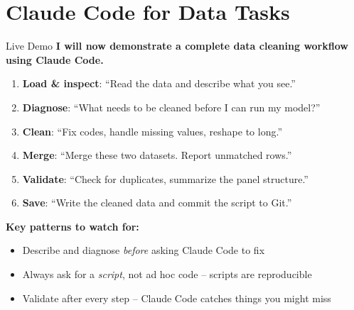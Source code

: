 \section{Claude Code for Data Tasks}

\begin{frame}{Live Demo}
  \textbf{I will now demonstrate a complete data cleaning workflow using Claude Code.}

  \vspace{10pt}

  \begin{enumerate}
    \item \textbf{Load \& inspect}: ``Read the data and describe what you see.''
    \item \textbf{Diagnose}: ``What needs to be cleaned before I can run my model?''
    \item \textbf{Clean}: ``Fix codes, handle missing values, reshape to long.''
    \item \textbf{Merge}: ``Merge these two datasets. Report unmatched rows.''
    \item \textbf{Validate}: ``Check for duplicates, summarize the panel structure.''
    \item \textbf{Save}: ``Write the cleaned data and commit the script to Git.''
  \end{enumerate}

  \vspace{10pt}

  \textbf{Key patterns to watch for:}
  \begin{itemize}
    \item Describe and diagnose \textit{before} asking Claude Code to fix
    \item Always ask for a \textit{script}, not ad hoc code -- scripts are reproducible
    \item Validate after every step -- Claude Code catches things you might miss
  \end{itemize}
\end{frame}


